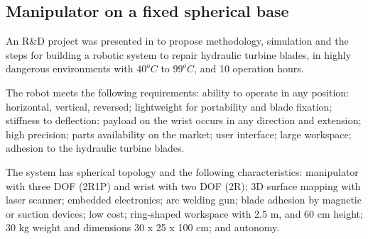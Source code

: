 \subsection{Manipulator on a fixed spherical base}
An R\&D project was presented in \cite{motta2010prototype} to propose
methodology, simulation and the steps for building a robotic system to repair
hydraulic turbine blades, %
 in highly dangerous environments with $ 40^o C$ to $ 99^o C$, and 10 operation
 hours.

The robot meets the following requirements: ability to operate in any position:
horizontal, vertical, reversed; lightweight for portability and blade fixation;
stiffness to deflection: payload on the wrist occurs in any direction and
extension; high precision; parts availability on the market; user interface;
large workspace; adhesion to the hydraulic turbine blades.


The system has spherical topology and the following characteristics: manipulator
with three DOF (2R1P) and wrist with two DOF (2R); 3D surface mapping with laser
scanner; embedded electronics; arc welding gun; blade adhesion by magnetic or
suction devices; low cost; ring-shaped workspace with 2.5 m, and 60 cm height;
30 kg weight and dimensions 30 x 25 x 100 cm; and autonomy.

